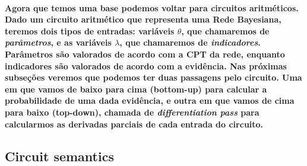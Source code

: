 \documentclass[a4paper,10pt]{article}
\theoremstyle{plain}
\begin{document}
\paragraph{
  Agora que temos uma base podemos voltar para circuitos aritméticos. Dado um circuito aritmético 
que representa uma Rede Bayesiana, teremos dois tipos de entradas: variáveis $\theta$, que 
chamaremos de \textit{parâmetros}, e as variáveis $\lambda$, que chamaremos de 
\textit{indicadores}. Parâmetros são valorados de acordo com a CPT da rede, enquanto indicadores
são valorados de acordo com a evidência. Nas próximas subseções veremos que podemos ter duas
passagens pelo circuito. Uma em que vamos de baixo para cima (bottom-up) para calcular a 
probabilidade de uma dada evidência, e outra em que vamos de cima para baixo (top-down), chamada
de \textit{differentiation pass} para calcularmos as derivadas parciais de cada entrada do 
circuito.
}

\subsection{Circuit semantics}


\newpage

\printbibliography
\end{document}
